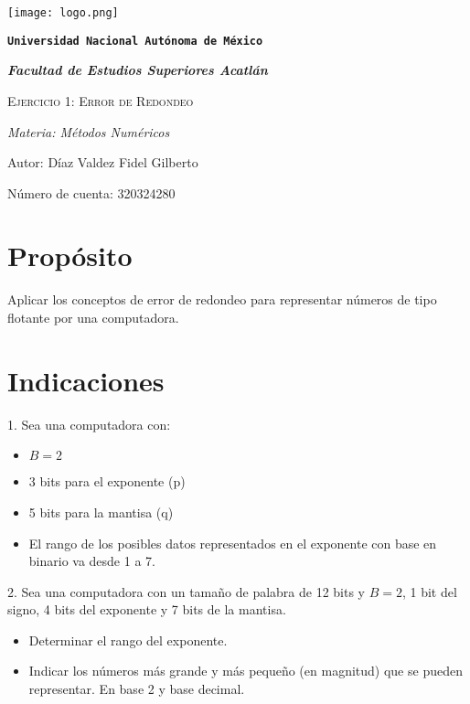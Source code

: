 \documentclass{article}
\begin{document}
\begin{titlepage}
    \centering
    {\texttt{[image: logo.png]}\par}
    {\texttt{\bfseries \LARGE Universidad Nacional Autónoma de México} \par}
    \vspace{1cm}
    {\itshape \Large \bfseries Facultad de Estudios Superiores Acatlán \par}
    \vspace{3cm}
    {\scshape \Huge Ejercicio 1: Error de Redondeo \par}
    \vspace {3cm}
    {\slshape \Large Materia: Métodos Numéricos \par}
    \vspace{2cm}
    {\Large Autor: Díaz Valdez Fidel Gilberto\par}
    {\Large Número de cuenta: 320324280\par}
    \vfill
\end{titlepage}

\section{Propósito}
Aplicar los conceptos de error de redondeo para representar números de tipo flotante
por una computadora.

\section{Indicaciones}
1. Sea una computadora con: 
\begin{itemize}
    \item $B=2$
    \item 3 bits para el exponente (p)
    \item 5 bits para la mantisa (q)
    \item El rango de los posibles datos representados en el exponente con base en binario va desde
    1 a 7.
\end{itemize}

2. Sea una computadora con un tamaño de palabra de 12 bits y $B=2$, 1 bit del signo, 4 bits del
exponente y 7 bits de la mantisa.
\begin{itemize}
    \item  Determinar el rango del exponente.
    \item  Indicar los números más grande y más pequeño (en magnitud) que se pueden
    representar. En base 2 y base decimal.
\end{itemize}
\end{document}
